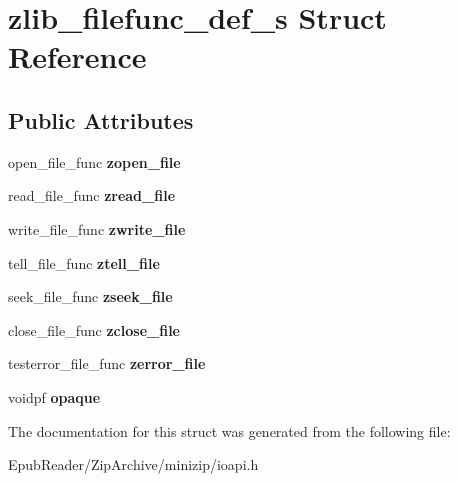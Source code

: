 \hypertarget{structzlib__filefunc__def__s}{\section{zlib\-\_\-filefunc\-\_\-def\-\_\-s Struct Reference}
\label{structzlib__filefunc__def__s}
}
\subsection*{Public Attributes}
\begin{DoxyCompactItemize}
\item 
\hypertarget{structzlib__filefunc__def__s_a49b78a559140e495b94af4d9dfe5c4e9}{open\-\_\-file\-\_\-func {\bfseries zopen\-\_\-file}}\label{structzlib__filefunc__def__s_a49b78a559140e495b94af4d9dfe5c4e9}

\item 
\hypertarget{structzlib__filefunc__def__s_ab14f748de7516525e5d2b78c47aca92e}{read\-\_\-file\-\_\-func {\bfseries zread\-\_\-file}}\label{structzlib__filefunc__def__s_ab14f748de7516525e5d2b78c47aca92e}

\item 
\hypertarget{structzlib__filefunc__def__s_a710b490fec793486ef5bedd9f2e1136d}{write\-\_\-file\-\_\-func {\bfseries zwrite\-\_\-file}}\label{structzlib__filefunc__def__s_a710b490fec793486ef5bedd9f2e1136d}

\item 
\hypertarget{structzlib__filefunc__def__s_ac8b933601443cdd83f8cc02004c77d0d}{tell\-\_\-file\-\_\-func {\bfseries ztell\-\_\-file}}\label{structzlib__filefunc__def__s_ac8b933601443cdd83f8cc02004c77d0d}

\item 
\hypertarget{structzlib__filefunc__def__s_a4747bdf97a3f44fe4b958114c11e1dcf}{seek\-\_\-file\-\_\-func {\bfseries zseek\-\_\-file}}\label{structzlib__filefunc__def__s_a4747bdf97a3f44fe4b958114c11e1dcf}

\item 
\hypertarget{structzlib__filefunc__def__s_ac46ac7ec0540dce117dab3f210d26763}{close\-\_\-file\-\_\-func {\bfseries zclose\-\_\-file}}\label{structzlib__filefunc__def__s_ac46ac7ec0540dce117dab3f210d26763}

\item 
\hypertarget{structzlib__filefunc__def__s_a61182b5b3ff83fb509b57ab4d2d9816d}{testerror\-\_\-file\-\_\-func {\bfseries zerror\-\_\-file}}\label{structzlib__filefunc__def__s_a61182b5b3ff83fb509b57ab4d2d9816d}

\item 
\hypertarget{structzlib__filefunc__def__s_a494b6d634b61bdc7fc7caed8e4fbe3f4}{voidpf {\bfseries opaque}}\label{structzlib__filefunc__def__s_a494b6d634b61bdc7fc7caed8e4fbe3f4}

\end{DoxyCompactItemize}


The documentation for this struct was generated from the following file\-:\begin{DoxyCompactItemize}
\item 
Epub\-Reader/\-Zip\-Archive/minizip/ioapi.\-h\end{DoxyCompactItemize}
